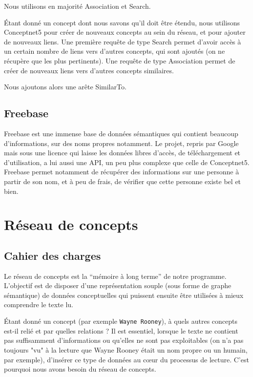 \documentclass[a4paper, 12pt]{article}
\begin{document}
Nous utilisons en majorité Association et Search.

Étant donné un concept dont nous savons qu'il doit être étendu, nous utilisons Conceptnet5 pour créer de nouveaux concepts au sein du réseau, et pour ajouter de nouveaux liens. Une première requête de type Search permet d'avoir accès à un certain nombre de liens vers d'autres concepts, qui sont ajoutés (on ne récupère que les plus pertinents). Une requête de type Association permet de créer de nouveaux liens vers d'autres concepts similaires.

Nous ajoutons alors une arête SimilarTo.

\subsection{Freebase}

Freebase est une immense base de données sémantiques qui contient beaucoup d'informations, sur des noms propres notamment. Le projet, repris par Google mais sous une licence qui laisse les données libres d'accès, de téléchargement et d'utilisation, a lui aussi une API, un peu plus complexe que celle de Conceptnet5. Freebase permet notamment de récupérer des informations sur une personne à partir de son nom, et à peu de frais, de vérifier que cette personne existe bel et bien.


\section{Réseau de concepts}

\subsection{Cahier des charges}

Le réseau de concepts est la ``mémoire à long terme'' de notre programme. L'objectif est de disposer d'une représentation souple (sous forme de graphe sémantique) de données conceptuelles qui puissent ensuite être utilisées à mieux comprendre le texte lu.

Étant donné un concept (par exemple \verb|Wayne Rooney|), à quels autres concepts est-il relié et par quelles relations ? Il est essentiel, lorsque le texte ne contient pas suffisamment d'informations ou qu'elles ne sont pas exploitables (on n'a pas toujours "vu" à la lecture que Wayne Rooney était un nom propre ou un humain, par exemple), d'insérer ce type de données au cœur du processus de lecture. C'est pourquoi nous avons besoin du réseau de concepts.
\end{document}

